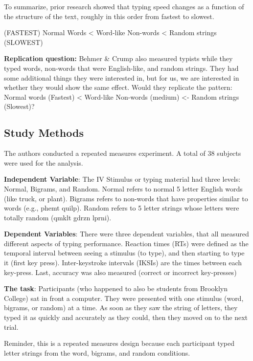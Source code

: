 \documentclass[
]{book}
\begin{document}
To summarize, prior research showed that typing speed changes as a function of the structure of the text, roughly in this order from fastest to slowest.

(FASTEST) Normal Words \textless{} Word-like Non-words \textless{} Random strings (SLOWEST)

\textbf{Replication question:} Behmer \& Crump also measured typists while they typed words, non-words that were English-like, and random strings. They had some additional things they were interested in, but for us, we are interested in whether they would show the same effect. Would they replicate the pattern: Normal words (Fastest) \textless{} Word-like Non-words (medium) \textless- Random strings (Slowest)?

\hypertarget{study-methods-1}{%
\subsection{Study Methods}\label{study-methods-1}}

The authors conducted a repeated measures experiment. A total of 38 subjects were used for the analysis.

\textbf{Independent Variable}: The IV Stimulus or typing material had three levels: Normal, Bigrams, and Random. Normal refers to normal 5 letter English words (like truck, or plant). Bigrams refers to non-words that have properties similar to words (e.g., phemt quilp). Random refers to 5 letter strings whose letters were totally random (qmklt gdrzn lprni).

\textbf{Dependent Variables}: There were three dependent variables, that all measured different aspects of typing performance. Reaction times (RTs) were defined as the temporal interval between seeing a stimulus (to type), and then starting to type it (first key press). Inter-keystroke intervals (IKSIs) are the times between each key-press. Last, accuracy was also measured (correct or incorrect key-presses)

\textbf{The task}: Participants (who happened to also be students from Brooklyn College) sat in front a computer. They were presented with one stimulus (word, bigrams, or random) at a time. As soon as they saw the string of letters, they typed it as quickly and accurately as they could, then they moved on to the next trial.

Reminder, this is a repeated measures design because each participant typed letter strings from the word, bigrams, and random conditions.
\end{document}
